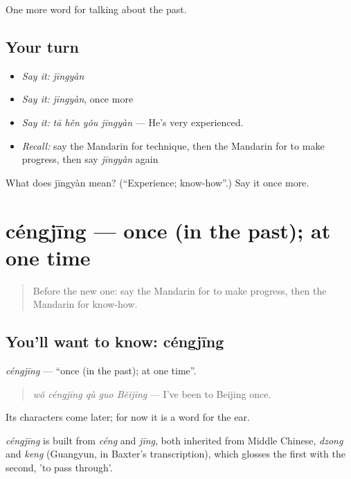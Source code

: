 \begin{grammarlens}[title={What you've built}]
One more word for talking about the past.
\end{grammarlens}

\subsection*{Your turn}
\begin{itemize}
\raggedright
  \item \emph{Say it:} \emph{jīngyàn}
  \item \emph{Say it:} \emph{jīngyàn}, once more
  \item \emph{Say it:} \emph{tā hěn yǒu jīngyàn} — He's very experienced.
  \item \emph{Recall:} say the Mandarin for technique, then the Mandarin for to make progress, then say \emph{jīngyàn} again
\end{itemize}

\begin{tcolorbox}[breakable,colback=teal!4,colframe=teal!35!black,title={Before you move on}]
What does jīngyàn mean? (\textquotedblleft{}Experience; know-how\textquotedblright{}.) Say it once more.
\end{tcolorbox}
\section[céngjīng]{céngjīng — once (in the past); at one time}

\label{lesson:ZH-C261-cengjing}



\begin{quote}
Before the new one: say the Mandarin for to make progress, then the Mandarin for know-how.
\end{quote}

\subsection*{You'll want to know: céngjīng}
\emph{céngjīng} — \textquotedblleft{}once (in the past); at one time\textquotedblright{}.

\begin{quote}
\emph{wǒ céngjīng qù guo Běijīng} — I've been to Beijing once.
\end{quote}

Its characters come later; for now it is a word for the ear.

\begin{cousinweb}
\emph{céngjīng} is built from \emph{céng} and \emph{jīng}, both inherited from Middle Chinese, \emph{dzong} and \emph{keng} (Guangyun, in Baxter's transcription), which glosses the first with the second, 'to pass through'.
\end{cousinweb}

